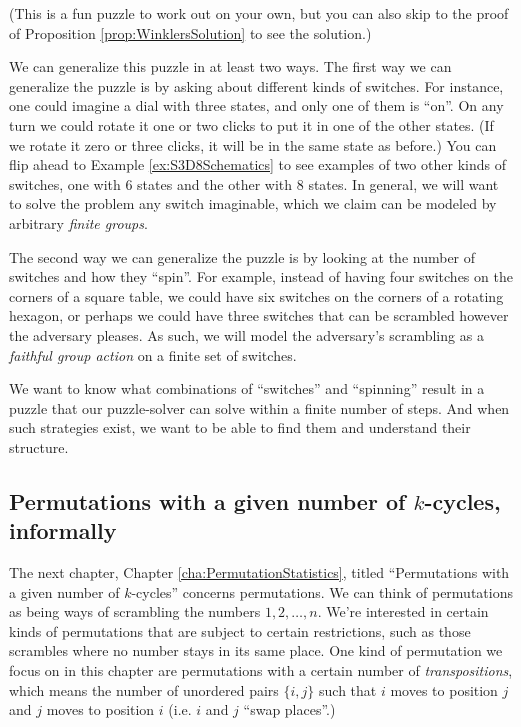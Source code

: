 (This is a fun puzzle to work out on your own, but you can also skip to
the proof of Proposition \ref{prop:WinklersSolution} to see the solution.)

We can generalize this puzzle in at least two ways.
The first way we can generalize the puzzle is by asking about different kinds of
switches. For instance, one could imagine a dial with three states,
and only one of them is ``on''.
On any turn we could rotate it one or two
clicks to put it in one of the other states.
(If we rotate it zero or three clicks, it will be in the same state as before.)
You can flip ahead to Example \ref{ex:S3D8Schematics} to see examples of two
other kinds of switches, one with $6$ states and the other with $8$ states.
In general, we will want to solve the problem any switch imaginable, which
we claim can be modeled by arbitrary \textit{finite groups}.

The second way we can generalize the puzzle is by looking at the number of
switches and how they ``spin''.
For example, instead of having four switches on the corners of a square table,
we could have six switches on the corners of a rotating hexagon, or perhaps
we could have three switches that can be scrambled however the adversary pleases.
As such, we will model the adversary's scrambling as a
\textit{faithful group action} on a finite set of switches.

We want to know what combinations of ``switches'' and ``spinning''
result in a puzzle that our puzzle-solver can solve within a finite number of
steps. And when such strategies exist, we want to be able to find them and
understand their structure.

\subsection{Permutations with a given number of \texorpdfstring{$k$}{k}-cycles, informally}
The next chapter, Chapter \ref{cha:PermutationStatistics}, titled
``Permutations with a given number of $k$-cycles''
concerns permutations.
We can think of permutations as being ways of scrambling the numbers
$1, 2, \dots, n$.
We're interested in certain kinds of permutations that are subject to certain
restrictions, such as those scrambles where no number stays in its same place.
One kind of permutation we focus on in this chapter are permutations with
a certain number of \textit{transpositions}, which means the number of unordered
pairs $\{i, j\}$ such that $i$ moves to position $j$ and $j$ moves to position $i$
(i.e. $i$ and $j$ ``swap places''.)


